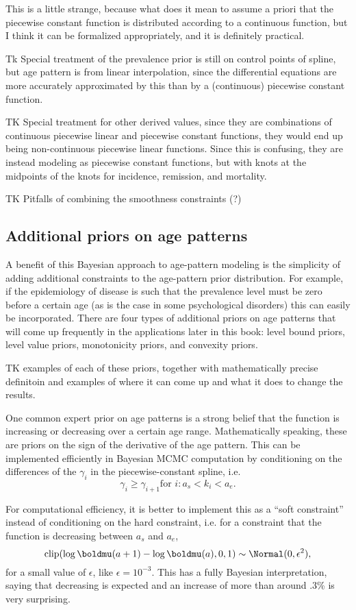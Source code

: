 This is a little strange, because what does it mean to assume a priori
that the piecewise constant function is distributed according to a
continuous function, but I think it can be formalized appropriately,
and it is definitely practical.

Tk Special treatment of the prevalence prior is still on control
points of spline, but age pattern is from linear interpolation, since
the differential equations are more accurately approximated by this
than by a (continuous) piecewise constant function.

TK Special treatment for other derived values, since they are
combinations of continuous piecewise linear and piecewise constant
functions, they would end up being non-continuous piecewise linear
functions.  Since this is confusing, they are instead modeling as
piecewise constant functions, but with knots at the midpoints of the
knots for incidence, remission, and mortality.

TK Pitfalls of combining the smoothness constraints (?)

\subsection{Additional priors on age patterns}
A benefit of this Bayesian approach to age-pattern modeling is the
simplicity of adding additional constraints to the age-pattern prior
distribution.  For example, if the epidemiology of disease is such
that the prevalence level must be zero before a certain age (as is the
case in some psychological disorders) this can easily be incorporated.
There are four types of additional priors on age patterns that will
come up frequently in the applications later in this book: level bound
priors, level value priors, monotonicity priors, and convexity priors.

TK examples of each of these priors, together with mathematically
precise definitoin and examples of where it can come up and what it
does to change the results.

One common expert prior on age patterns is a strong belief that the
function is increasing or decreasing over a certain age range.
Mathematically speaking, these are priors on the sign of the
derivative of the age pattern.  This can be implemented efficiently in
Bayesian MCMC computation by conditioning on the differences of the
$\gamma_i$ in the piecewise-constant spline, i.e.
\[
\gamma_i \geq \gamma_{i+1} \text{for } i : a_s < k_i < a_e.
\]

For computational efficiency, it is better to implement this as a
``soft constraint'' instead of conditioning on the hard constraint,
i.e. for a constraint that the function is decreasing between $a_s$
and $a_e$,
\[
\operatorname{clip}(\log \boldmu(a+1) - \log \boldmu(a), 0, 1) \sim \Normal(0, \epsilon^2),
\]
for a small value of $\epsilon$, like $\epsilon = 10^{-3}$.  This has
a fully Bayesian interpretation, saying that decreasing is expected
and an increase of more than around .3\% is very surprising.

